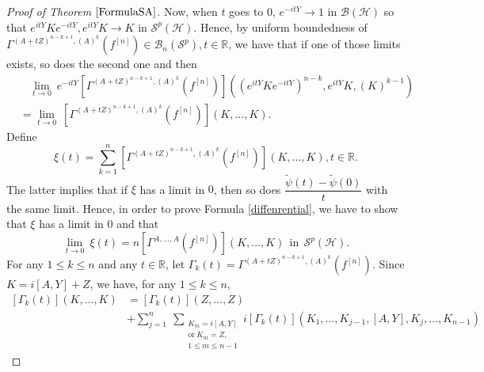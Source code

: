 \documentclass[12pt]{amsart}
\theoremstyle{remark}
\begin{document}
\begin{proof}[Proof of Theorem $\ref{FormulaSA}$]
Now, when $t$ goes to $0$, $e^{-itY} \to 1$ in $\mathcal{B}(\mathcal{H})$ so that $e^{itY}Ke^{-itY}, e^{itY}K \to K$ in $\mathcal{S}^p(\mathcal{H})$. Hence, by uniform boundedness of $\Gamma^{(A+tZ)^{n-k+1}, (A)^k}(f^{[n]}) \in \mathcal{B}_n(\mathcal{S}^p), t\in \mathbb{R}$, we have that if one of those limits exists, so does the second one and then
\begin{align*}
& ~ \ \ \ \underset{t \to 0}{\lim} \ e^{-itY}\left[ \Gamma^{(A+tZ)^{n-k+1}, (A)^k}(f^{[n]})\right]\left((e^{itY}Ke^{-itY})^{n-k},e^{itY}K, (K)^{k-1} \right) \\
& = \underset{t \to 0}{\lim} \ \left[ \Gamma^{(A+tZ)^{n-k+1}, (A)^k}(f^{[n]})\right]\left(K, \ldots, K \right).
\end{align*}
Define
$$
\xi(t) = \displaystyle \sum_{k=1}^n \left[ \Gamma^{(A+tZ)^{n-k+1}, (A)^k}(f^{[n]})\right] (K, \ldots, K), t \in \mathbb{R}.
$$
The latter implies that if $\xi$ has a limit in $0$, then so does $\dfrac{\tilde{\psi}(t) - \tilde{\psi}(0)}{t}$ with the same limit. Hence, in order to prove Formula \eqref{diffenrential}, we have to show that $\xi$ has a limit in $0$ and that
$$
\underset{t \to 0}{\lim} \ \xi(t) = n \left[\Gamma^{A, \ldots, A}(f^{[n]}) \right](K, \ldots, K) \ \ \text{in} \ \ \mathcal{S}^p(\mathcal{H}).
$$
For any $1\leq k\leq n$ and any $t\in \mathbb{R}$, let $\Gamma_k(t) = \Gamma^{(A+tZ)^{n-k+1}, (A)^k}(f^{[n]}).$
Since $K = i[A,Y] + Z$, we have, for any $1\leq k \leq n$,
\begin{align*}
\left[\Gamma_k(t) \right](K,\ldots,K)
&  = \left[ \Gamma_k(t) \right] (Z, \ldots, Z) \\
&  + \sum_{j=1}^n \ \sum_{\substack{K_m = i[A,Y] \\\text{or} \ K_m=Z, \\ 1 \leq m \leq n-1}} i \left[ \Gamma_k(t) \right] (K_1, \ldots, K_{j-1}, [A,Y], K_j, \ldots, K_{n-1})
\end{align*}




\end{proof}
\end{document}
